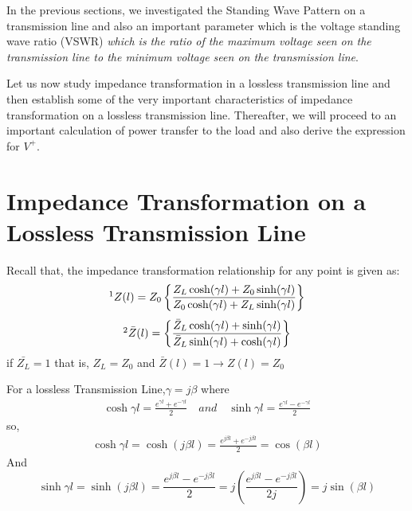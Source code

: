 In the previous sections, we investigated the Standing Wave Pattern on a transmission line and also an important parameter which is the voltage standing wave ratio (VSWR) \emph{which is the ratio of the maximum voltage seen on the transmission line to the minimum voltage seen on the transmission line}.

Let us now study impedance transformation in a lossless transmission line and then establish some of the very important characteristics of impedance transformation on a lossless transmission line. Thereafter, we will proceed to an important calculation of power transfer to the load and also derive the expression for $V^{+}$.

\section{Impedance Transformation on a Lossless Transmission Line}\label{lec:lec6}
Recall that, the impedance transformation relationship for any point is given as:
\begin{align*}
\footnotemark[1]Z(l) = Z_0\left\lbrace \frac{Z_L\cosh(\gamma l) + Z_0\sinh(\gamma l)}{Z_0\cosh(\gamma l) + Z_L\sinh(\gamma l)}\right\rbrace 
\end{align*}
\begin{align*}
\footnotemark[2]\bar{Z}(l) = \left\lbrace \frac{\bar{Z}_L\cosh(\gamma l) + \sinh(\gamma l)}{\bar{Z}_L\sinh(\gamma l) + \cosh(\gamma l)}\right\rbrace 
\end{align*}
if $\bar{Z_L} = 1$ that is, $Z_L = Z_0$ and $\bar{Z}(l) = 1 \rightarrow  Z(l) = Z_0$

For a lossless Transmission Line,$\gamma=j\beta$ where
\begin{align*}
\cosh\gamma l = \frac{e^{\gamma l} + e^{-\gamma l}}{2} \quad and \quad \sinh\gamma l = \frac{e^{\gamma l} - e^{-\gamma l}}{2}
\end{align*}
so,
\begin{align*}
\cosh\gamma l= \cosh(j\beta l)=\frac{e^{j \beta l} + e^{-j \beta l}}{2}=\cos(\beta l)
\end{align*}
And
\begin{dmath*}
\sinh\gamma l=\sinh(j\beta l) = \frac{e^{j \beta l}-e^{-j\beta l}}{2} = j\left( \frac{e^{j\beta l}-e^{-j\beta l}}{2j}\right) =j\sin(\beta l)
\end{dmath*}

